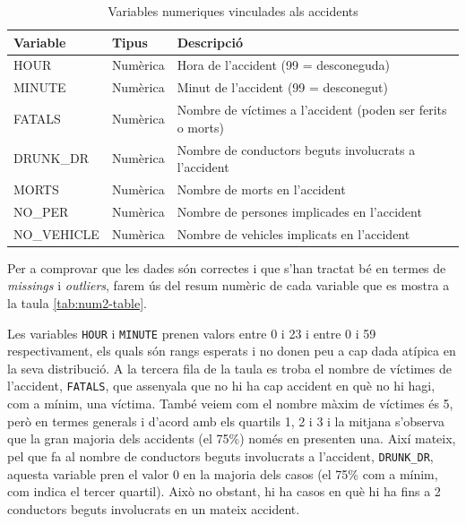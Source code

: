 \documentclass[12pt,longbibliography]{article}
\theoremstyle{definition}
\theoremstyle{remark}
\begin{document}
\begin{table}[H]
\centering
\begin{tabular}{lll}
\hline
Variable    & Tipus    & Descripció                                           \\ \hline
HOUR        & Numèrica & Hora de l’accident (99 = desconeguda)                \\
MINUTE      & Numèrica & Minut de l’accident (99 = desconegut)                \\
FATALS      & Numèrica & Nombre de víctimes a l’accident (poden ser ferits o morts)                      \\
DRUNK\_DR   & Numèrica & Nombre de conductors beguts involucrats a l’accident \\
MORTS       & Numèrica & Nombre de morts en l’accident                        \\
NO\_PER     & Numèrica & Nombre de persones implicades en l’accident          \\
NO\_VEHICLE & Numèrica & Nombre de vehicles implicats en l’accident           \\ \hline
\end{tabular}
\caption{Variables numeriques vinculades als accidents}
\label{tab:num-table}
\end{table}

Per a comprovar que les dades són correctes i que s'han tractat bé en termes de \emph{missings} i \emph{outliers}, farem ús del resum numèric de cada variable que es mostra a la taula \ref{tab:num2-table}. 

Les variables \texttt{HOUR} i \texttt{MINUTE} prenen valors entre 0 i 23 i entre 0 i 59 respectivament, els quals són rangs esperats i no donen peu a cap dada atípica en la seva distribució. A la tercera fila de la taula es troba el nombre de víctimes de l'accident, \texttt{FATALS}, que assenyala que no hi ha cap accident en què no hi hagi, com a mínim, una víctima. També veiem com el nombre màxim de víctimes és 5, però en termes generals i d'acord amb els quartils 1, 2 i 3 i la mitjana s'observa que la gran majoria dels accidents (el 75\%) només en presenten una. Així mateix, pel que fa al nombre de conductors beguts involucrats a l'accident, \texttt{DRUNK\_DR}, aquesta variable pren el valor 0 en la majoria dels casos (el 75\% com a mínim, com indica el tercer quartil). Això no obstant, hi ha casos en què hi ha fins a 2 conductors beguts involucrats en un mateix accident. 
\end{document}
